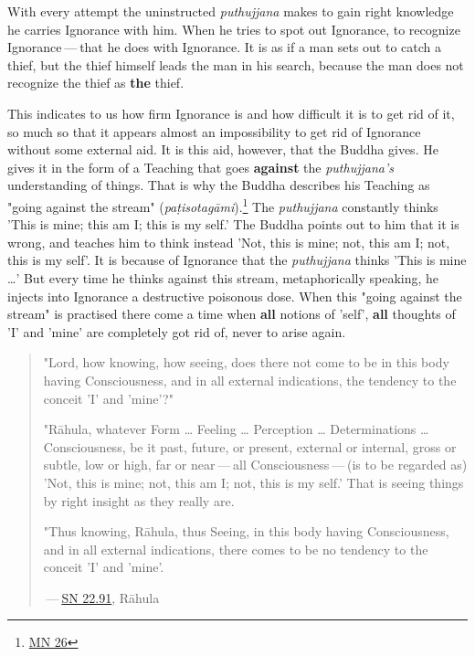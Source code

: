 With every attempt the uninstructed \emph{puthujjana} makes to gain right knowledge he carries Ignorance with him. When he tries to spot out Ignorance, to recognize Ignorance --- that he does with Ignorance. It is as if a man sets out to catch a thief, but the thief himself leads the man in his search, because the man does not recognize the thief as \textbf{the} thief.

This indicates to us how firm Ignorance is and how difficult it is to get rid of it, so much so that it appears almost an impossibility to get rid of Ignorance without some external aid. It is this aid, however, that the Buddha gives. He gives it in the form of a Teaching that goes \textbf{against} the \emph{puthujjana's} understanding of things. That is why the Buddha describes his Teaching as "going against the stream" (\emph{paṭisotagāmi}).\footnote{\href{https://suttacentral.net/mn26/en/bodhi}{MN 26}} The \emph{puthujjana} constantly thinks 'This is mine; this am I; this is my self.' The Buddha points out to him that it is wrong, and teaches him to think instead 'Not, this is mine; not, this am I; not, this is my self'. It is because of Ignorance that the \emph{puthujjana} thinks 'This is mine \ldots\hspace{0pt}' But every time he thinks against this stream, metaphorically speaking, he injects into Ignorance a destructive poisonous dose. When this "going against the stream" is practised there come a time when \textbf{all} notions of 'self', \textbf{all} thoughts of 'I' and 'mine' are completely got rid of, never to arise again.

\begin{quote}
"Lord, how knowing, how seeing, does there not come to be in this body having Consciousness, and in all external indications, the tendency to the conceit 'I' and 'mine'?"

"Rāhula, whatever Form \ldots\hspace{0pt} Feeling \ldots\hspace{0pt} Perception \ldots\hspace{0pt} Determinations \ldots\hspace{0pt} Consciousness, be it past, future, or present, external or internal, gross or subtle, low or high, far or near --- all Consciousness --- (is to be regarded as) 'Not, this is mine; not, this am I; not, this is my self.' That is seeing things by right insight as they really are.

"Thus knowing, Rāhula, thus Seeing, in this body having Consciousness, and in all external indications, there comes to be no tendency to the conceit 'I' and 'mine'.

 --- \href{https://suttacentral.net/sn22.91/en/bodhi}{SN 22.91}, Rāhula
\end{quote}

